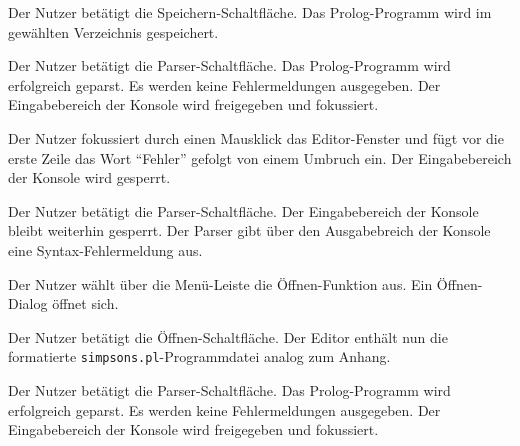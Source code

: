 \documentclass[parskip=full,11pt,twoside]{scrartcl}
\begin{document}
{Der Nutzer betätigt die Speichern-Schaltfläche.}
{Das Prolog-Programm wird im gewählten Verzeichnis gespeichert.}

{Der Nutzer betätigt die Parser-Schaltfläche.}
{Das Prolog-Programm wird erfolgreich geparst. Es werden keine Fehlermeldungen ausgegeben. Der Eingabebereich der Konsole wird freigegeben und fokussiert.}

{Der Nutzer fokussiert durch einen Mausklick das Editor-Fenster und fügt vor die erste Zeile das Wort \enquote{Fehler} gefolgt von einem Umbruch ein.}
{Der Eingabebereich der Konsole wird gesperrt.}

{Der Nutzer betätigt die Parser-Schaltfläche.}
{Der Eingabebereich der Konsole bleibt weiterhin gesperrt. Der Parser gibt über den Ausgabebreich der Konsole eine Syntax-Fehlermeldung aus.}



{Der Nutzer wählt über die Menü-Leiste die Öffnen-Funktion aus.}
{Ein Öffnen-Dialog öffnet sich.}

{Der Nutzer betätigt die Öffnen-Schaltfläche.}
{Der Editor enthält nun die formatierte \texttt{simpsons.pl}-Programmdatei analog zum Anhang.}

{Der Nutzer betätigt die Parser-Schaltfläche.}
{Das Prolog-Programm wird erfolgreich geparst. Es werden keine Fehlermeldungen ausgegeben. Der Eingabebereich der Konsole wird freigegeben und fokussiert.}
\end{document}
